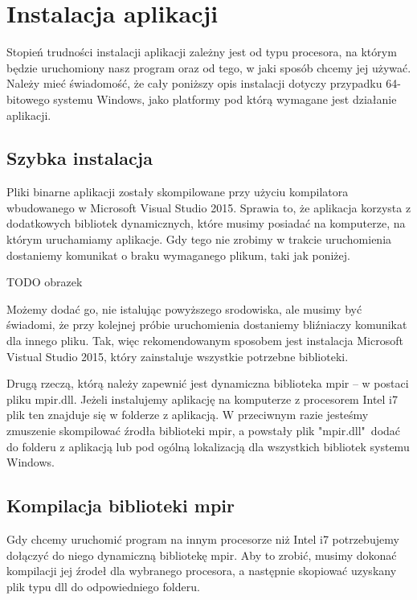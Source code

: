 \documentclass[oneside,a4paper]{book}
\begin{document}
	\section{Instalacja aplikacji}
	
	Stopień trudności instalacji aplikacji zależny jest od typu procesora, na którym będzie uruchomiony nasz program oraz od tego, w jaki sposób chcemy jej używać. Należy mieć świadomość, że cały poniższy opis instalacji dotyczy przypadku 64-bitowego systemu Windows, jako platformy pod którą wymagane jest działanie aplikacji.
	
	\subsection{Szybka instalacja}
	
	Pliki binarne aplikacji zostały skompilowane przy użyciu kompilatora wbudowanego w Microsoft Visual Studio 2015. Sprawia to, że aplikacja korzysta z dodatkowych bibliotek dynamicznych, które musimy posiadać na komputerze, na którym uruchamiamy aplikacje. Gdy tego nie zrobimy w trakcie uruchomienia dostaniemy komunikat o braku wymaganego plikum, taki jak poniżej.
	
	TODO obrazek
	
	Możemy dodać go, nie istalując powyższego srodowiska, ale musimy być świadomi, że przy kolejnej próbie uruchomienia dostaniemy bliźniaczy komunikat dla innego pliku. Tak, więc rekomendowanym sposobem jest instalacja Microsoft Vistual Studio 2015, który zainstaluje wszystkie potrzebne biblioteki.
	
	Drugą rzeczą, którą należy zapewnić jest dynamiczna biblioteka mpir -- w postaci pliku mpir.dll. Jeżeli instalujemy aplikację na komputerze z procesorem Intel i7 plik ten znajduje się w folderze z aplikacją. W przeciwnym razie jesteśmy zmuszenie skompilować źrodła biblioteki mpir, a powstały plik "mpir.dll"\ dodać do folderu z aplikacją lub pod ogólną lokalizacją dla wszystkich bibliotek systemu Windows.
	
	\subsection{Kompilacja biblioteki mpir}
	
	Gdy chcemy uruchomić program na innym procesorze niż Intel i7 potrzebujemy dołączyć do niego dynamiczną bibliotekę mpir. Aby to zrobić, musimy dokonać kompilacji jej źrodeł dla wybranego procesora, a następnie skopiować uzyskany plik typu dll do odpowiedniego folderu.
	
\end{document}
